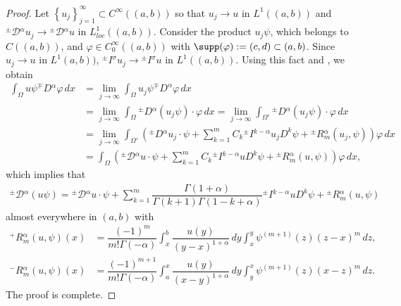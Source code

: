 \documentclass[leqno,final]{siamltex}
\numberwithin{equation}{section}
\renewcommand{\(}{\bigl(}
\renewcommand{\)}{\bigr)}
\begin{document}
\begin{proof}
    Let $\left\{u_j \right\}_{j=1}^{\infty} \subset C^{\infty}((a,b))$ so that $u_j \rightarrow u$ in $ L^{1}((a,b))$ 
   and ${^{\pm}}{\mathcal{D}}{^{\alpha}} u_j \rightarrow {^{\pm}}{\mathcal{D}}{^{\alpha}} u$ in $
     L^{1}_{loc}((a,b))$. Consider the product $u_j \psi$, which belongs to $C((a,b))$,  and $\varphi \in C^{\infty}_{0}((a,b))$ with $\supp(\varphi) : = (c,d) \subset (a,b)$.  
      Since $u_j \rightarrow u$ in  $L^{1}(a,b))$, ${^{\pm}}{I}{^{\sigma}} u_j \rightarrow 
      {^{\pm}}{I}{^{\sigma}} u$ in $L^{1}((a,b))$. Using this fact and \cite[Theorem 2.3]{Feng_Sutton}, we obtain  
    \begin{align*}
        \int_{\Omega} u \psi {^{\mp}}{D}{^{\alpha}}\varphi\,dx
        &= \lim_{j \rightarrow \infty} \int_{\Omega} u_j \psi {^{\mp}}{D}^{{\alpha}} \varphi \,dx \\
        &= \lim_{j\rightarrow \infty} \int_{\Omega} {^{\pm}}{D}{^{\alpha}} (u_j \psi) \cdot \varphi \,dx
        = \lim_{j\rightarrow \infty} \int_{\Omega'} {^{\pm}}{D}{^{\alpha}} (u_j \psi) \cdot \varphi\,dx \\
        &= \lim_{j \rightarrow \infty} \int_{\Omega'} \left({^{\pm}}{D}{^{\alpha}} u_j \cdot \psi + \sum_{k=1}^{m} C_{k} {^{\pm}}{I}{^{k-\alpha}} u_j D^{k} \psi + {^{\pm}}{R}{^{\alpha}_{m}}(u_j,\psi) \right) \varphi\,dx \\ 
        &= \int_{\Omega} \left({^{\pm}}{\mathcal{D}}{^{\alpha}} u \cdot \psi + \sum_{k=1}^{m} C_{k} {^{\pm}}{I}{^{k-\alpha}} u D^{k} \psi + {^{\pm}}{R}{^{\alpha}_{m}(u,\psi)} \right) \varphi\,dx,
    \end{align*}
    which implies that 
    \begin{align*}
        {^{\pm}}{\mathcal{D}}{^{\alpha}} (u\psi) = {^{\pm}}{\mathcal{D}}{^{\alpha}} u \cdot \psi + \sum_{k=1}^{m} \dfrac{\Gamma(1+ \alpha)}{\Gamma(k+1) \Gamma(1 - k + \alpha)} {^{\pm}}{I}{^{k-\alpha}} u D^{k} \psi + {^{\pm}}{R}{_{m}^{\alpha}}(u,\psi)
    \end{align*}
    almost everywhere in $(a,b)$ with 
    \begin{align*}
        {^{+}}{R}{^{\alpha}_{m}} (u,\psi) (x) &= \dfrac{(-1)^{m}}{m! \Gamma(-\alpha)} \int_{x}^{b} \dfrac{u(y)}{(y -x )^{1 + \alpha}} \, dy \int_{x}^{y} \psi^{(m+1)} (z) (z - x)^{m} \, dz, \\
        {^{-}}{R}{^{\alpha}_{m}}(u,\psi)(x) & = \dfrac{(-1)^{m+1}}{m! \Gamma(-\alpha)} \int_{a}^{x} \dfrac{u(y)}{(x-y)^{1 + \alpha}} \, dy \int_{y}^{x} \psi^{(m+1)}(z) ( x-z)^{m} \, dz.
    \end{align*}
    The proof is complete.
\end{proof}
\end{document}
